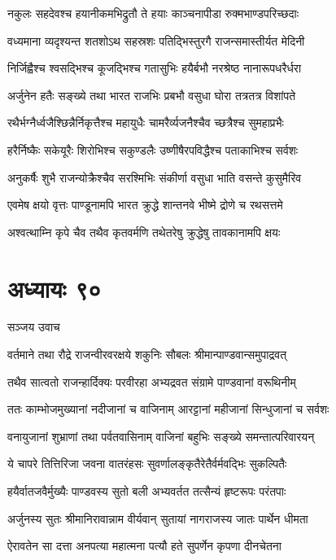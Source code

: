 \twolineshloka
{नकुलः सहदेवश्च हयानीकमभिद्रुतौ}
{ते हयाः काञ्चनापीडा रुक्मभाण्डपरिच्छदाः}


\twolineshloka
{वध्यमाना व्यदृश्यन्त शतशोऽथ सहस्रशः}
{पतिद्भिस्तुरगै राजन्समास्तीर्यत मेदिनी}


\twolineshloka
{निर्जिह्वैश्च श्वसद्भिश्च कूजद्भिश्च गतासुभिः}
{हयैर्बभौ नरश्रेष्ठ नानारूपधरैर्धरा}


\twolineshloka
{अर्जुनेन हतैः सङ्ख्ये तथा भारत राजभिः}
{प्रबभौ वसुधा घोरा तत्रतत्र विशांपते}


\twolineshloka
{रथैर्भग्नैर्ध्वजैश्छिन्नैर्निकृत्तैश्च महायुधैः}
{चामरैर्व्यजनैश्चैव च्छत्रैश्च सुमहाप्रभैः}


\twolineshloka
{हरैर्निष्कैः सकेयूरैः शिरोभिश्च सकुण्डलैः}
{उष्णीषैरपविद्धैश्च पताकाभिश्च सर्वशः}


\twolineshloka
{अनुकर्षैः शुभै राजन्योक्रैश्चैव सरश्मिभिः}
{संकीर्णा वसुधा भाति वसन्ते कुसुमैरिव}


\twolineshloka
{एवमेष क्षयो वृत्तः पाण्डूनामपि भारत}
{क्रुद्धे शान्तनवे भीष्मे द्रोणे च रथसत्तमे}


\twolineshloka
{अश्वत्थाम्नि कृपे चैव तथैव कृतवर्मणि}
{तथेतरेषु क्रुद्धेषु तावकानामपि क्षयः}


\chapter{अध्यायः ९०}
\twolineshloka
{सञ्जय उवाच}
{}


\twolineshloka
{वर्तमाने तथा रौद्रे राजन्वीरवरक्षये}
{शकुनिः सौबलः श्रीमान्पाण्डवान्समुपाद्रवत्}


\twolineshloka
{तथैव सात्वतो राजन्हार्दिक्यः परवीरहा}
{अभ्यद्रवत संग्रामे पाण्डवानां वरूथिनीम्}


\twolineshloka
{ततः काम्भोजमुख्यानां नदीजानां च वाजिनाम्}
{आरट्टानां महीजानां सिन्धुजानां च सर्वशः}


\twolineshloka
{वनायुजानां शुभ्राणां तथा पर्वतवासिनाम्}
{वाजिनां बहुभिः सङ्ख्ये समन्तात्परिवारयन्}


\twolineshloka
{ये चापरे तित्तिरिजा जवना वातरंहसः}
{सुवर्णालङ्कृतैरेतैर्वर्मवद्भिः सुकल्पितैः}


\twolineshloka
{हयैर्वातजवैर्मुख्यैः पाण्डवस्य सुतो बली}
{अभ्यवर्तत तत्सैन्यं हृष्टरूपः परंतपाः}


\twolineshloka
{अर्जुनस्य सुतः श्रीमानिरावान्नाम वीर्यवान्}
{सुतायां नागराजस्य जातः पार्थेन धीमता}


\twolineshloka
{ऐरावतेन सा दत्ता अनपत्या महात्मना}
{पत्यौ हते सुपर्णेन कृपणा दीनचेतना}


